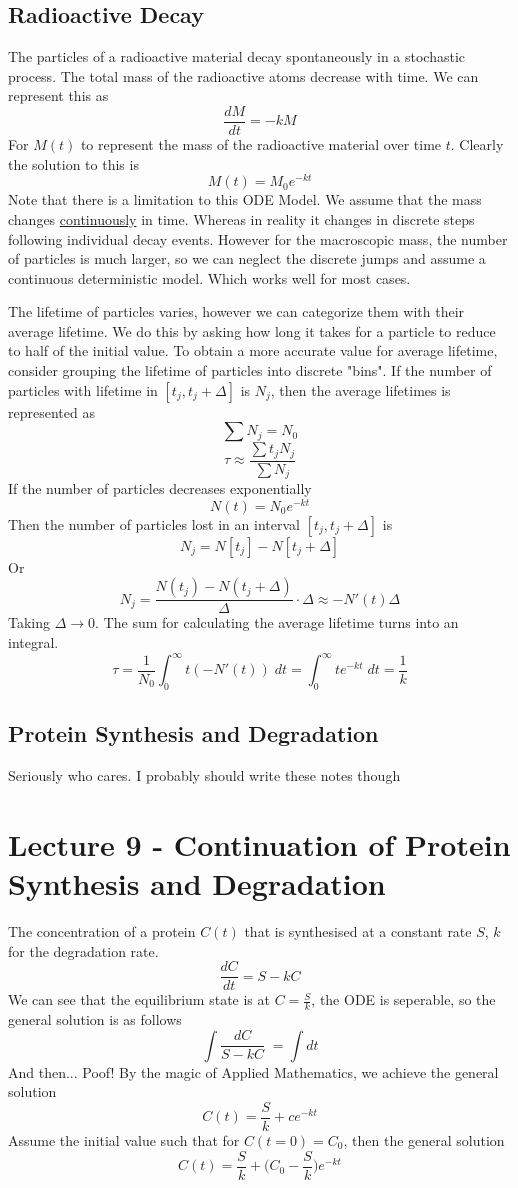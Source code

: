 \documentclass{report}
\theoremstyle{definition}
\theoremstyle{plain}
\theoremstyle{remark}
\begin{document}
\subsection{Radioactive Decay}
The particles of a radioactive material decay spontaneously in a stochastic
process. The total mass of the radioactive atoms decrease with time. We can represent this as 
$$ \frac{dM}{dt} = -kM $$
For $ M(t) $ to represent the mass of the radioactive material over time $ t $.
\noindent
Clearly the solution to this is 
$$ M(t) = M_0 e^{-kt} $$
Note that there is a limitation to this ODE Model. We assume that the mass changes \underline{continuously} in time. Whereas in reality it 
changes in discrete steps following individual decay events. However 
for the macroscopic mass, the number of particles is much larger, so we can neglect the discrete jumps and assume a continuous deterministic model. Which works well for most cases.
\\ \par
The lifetime of particles varies, however we can categorize them
with their average lifetime. We do this by asking how long it
takes for a particle to reduce to half of the initial value.
To obtain a more accurate value for average lifetime, consider
grouping the lifetime of particles into discrete "bins". If the
number of particles with lifetime in $ [t_j, t_j + \Delta] $
is $ N_j $, then the average lifetimes is represented as
$$ \sum N_j = N_0 $$
$$ \tau \approx \frac{ \displaystyle \sum t_j N_j}{\displaystyle \sum N_j} $$
If the number of particles decreases exponentially
$$ N(t) = N_0 e^{-kt} $$
Then the number of particles lost in an interval $ [t_j, t_j + \Delta] $ is 
$$ N_j = N[t_j] - N[t_j + \Delta] $$
Or
$$ N_j = \frac{N(t_j) - N(t_j + \Delta)}{\Delta} \cdot \Delta
\approx - N'(t)\Delta$$
Taking $ \Delta \to 0 $. The sum for calculating the average lifetime turns into an integral.
$$ \tau = \frac{1}{N_0} \int_0^\infty  t(-N'(t)) \; dt = 
\int_0^\infty te^{-kt} \; dt = \frac{1}{k}$$
\subsection{Protein Synthesis and Degradation}
Seriously who cares. I probably should write these notes though
\section{Lecture 9 - Continuation of Protein Synthesis and Degradation}
The concentration of a protein $ C(t) $ that is synthesised at a constant rate
$ S $, $ k $ for the degradation rate.
$$ \frac{dC}{dt} = S - kC $$
We can see that the equilibrium state is at $ C = \frac{S}{k} $, the ODE is
seperable, so the general solution is as follows
$$ \int \frac{dC}{S-kC} \; = \int dt $$
And then... Poof! By the magic of Applied Mathematics, we achieve the general
solution
$$ C(t) = \frac{S}{k} + ce^{-kt} $$
Assume the initial value such that for $ C(t=0) = C_0 $, then the general
solution
$$ C(t) = \frac{S}{k} + \Big (C_0 - \frac{S}{k} \Big) e^{-kt} $$
\end{document}

